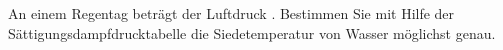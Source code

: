 An einem Regentag beträgt der Luftdruck \pRO. Bestimmen Sie mit Hilfe der Sättigungsdampfdrucktabelle die Siedetemperatur von Wasser möglichst genau.

